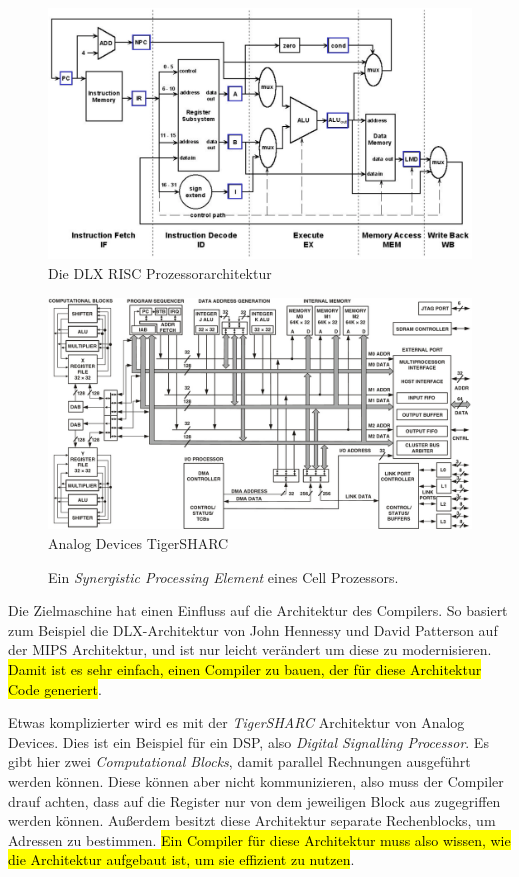 \documentclass[ngerman,abstract=true]{scrartcl}
\begin{document}
\begin{figure}[p]
\includegraphics[width=\textwidth]{media/dlx}
\caption{Die DLX RISC Prozessorarchitektur}\label{fig:dlx}
\end{figure}
\begin{figure}[p]
\includegraphics[width=\textwidth]{media/tigersharc}
\caption{Analog Devices TigerSHARC}\label{fig:tigersharc}
\end{figure}
\begin{figure}
\caption{Ein \emph{Synergistic Processing Element} eines Cell Prozessors.}\label{fig:spe}
\end{figure}

Die Zielmaschine hat einen Einfluss auf die Architektur des Compilers. So basiert zum Beispiel die DLX-Architektur von John Hennessy und David Patterson auf der MIPS Architektur, und ist nur leicht verändert um diese zu modernisieren. \hl{Damit ist es sehr einfach, einen Compiler zu bauen, der für diese Architektur Code generiert}.

Etwas komplizierter wird es mit der \emph{TigerSHARC} Architektur von Analog Devices. Dies ist ein Beispiel für ein DSP, also \emph{Digital Signalling Processor}. Es gibt hier zwei \emph{Computational Blocks}, damit parallel Rechnungen ausgeführt werden können. Diese können aber nicht kommunizieren, also muss der Compiler drauf achten, dass auf die Register nur von dem jeweiligen Block aus zugegriffen werden können. Außerdem besitzt diese Architektur separate Rechenblocks, um Adressen zu bestimmen. \hl{Ein Compiler für diese Architektur muss also wissen, wie die Architektur aufgebaut ist, um sie effizient zu nutzen}.
\end{document}
